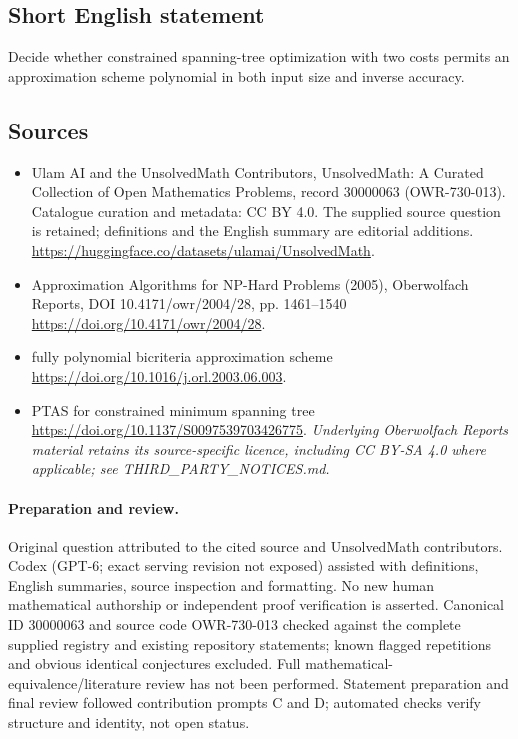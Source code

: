 \documentclass[11pt]{article}
\begin{document}
\subsection{Short English statement}
Decide whether constrained spanning-tree optimization with two costs permits an approximation scheme polynomial in both input size and inverse accuracy.
\subsection{Sources}
\begin{itemize}
\item[\hypertarget{source:30000063:1}{S1}] Ulam AI and the UnsolvedMath Contributors, UnsolvedMath: A Curated Collection of Open Mathematics Problems, record 30000063 (OWR-730-013). Catalogue curation and metadata: CC BY 4.0. The supplied source question is retained; definitions and the English summary are editorial additions.
\url{https://huggingface.co/datasets/ulamai/UnsolvedMath}.
\item[\hypertarget{source:30000063:2}{S2}] Approximation Algorithms for NP-Hard Problems (2005), Oberwolfach Reports, DOI 10.4171/owr/2004/28, pp. 1461--1540
\url{https://doi.org/10.4171/owr/2004/28}.
\item[\hypertarget{source:30000063:3}{S3}] fully polynomial bicriteria approximation scheme
\url{https://doi.org/10.1016/j.orl.2003.06.003}.
\item[\hypertarget{source:30000063:4}{S4}] PTAS for constrained minimum spanning tree
\url{https://doi.org/10.1137/S0097539703426775}.
\textit{Underlying Oberwolfach Reports material retains its source-specific licence, including CC BY-SA 4.0 where applicable; see THIRD\_PARTY\_NOTICES.md.}
\end{itemize}
\paragraph{Preparation and review.}
Original question attributed to the cited source and UnsolvedMath contributors. Codex (GPT-6; exact serving revision not exposed) assisted with definitions, English summaries, source inspection and formatting. No new human mathematical authorship or independent proof verification is asserted. Canonical ID 30000063 and source code OWR-730-013 checked against the complete supplied registry and existing repository statements; known flagged repetitions and obvious identical conjectures excluded. Full mathematical-equivalence/literature review has not been performed. Statement preparation and final review followed contribution prompts C and D; automated checks verify structure and identity, not open status.
\label{end:30000063}
\end{document}
